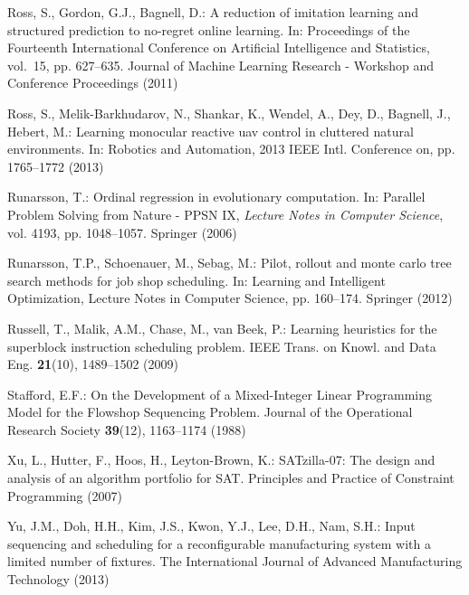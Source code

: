 \documentclass[twocolumn]{svjour3}
\begin{document}
\begin{thebibliography}{10}
    Ross, S., Gordon, G.J., Bagnell, D.: A reduction of imitation learning and
    structured prediction to no-regret online learning.
    \newblock In: Proceedings of the Fourteenth International Conference on
    Artificial Intelligence and Statistics, vol.~15, pp. 627--635. Journal of
    Machine Learning Research - Workshop and Conference Proceedings (2011)
    
    Ross, S., Melik-Barkhudarov, N., Shankar, K., Wendel, A., Dey, D., Bagnell, 
    J.,
    Hebert, M.: Learning monocular reactive uav control in cluttered natural
    environments.
    \newblock In: Robotics and Automation, 2013 IEEE Intl. Conference on, pp.
    1765--1772 (2013)
    
    Runarsson, T.: Ordinal regression in evolutionary computation.
    \newblock In: Parallel Problem Solving from Nature - PPSN IX, \emph{Lecture
        Notes in Computer Science}, vol. 4193, pp. 1048--1057. Springer (2006)
    
    Runarsson, T.P., Schoenauer, M., Sebag, M.: Pilot, rollout and monte carlo 
    tree
    search methods for job shop scheduling.
    \newblock In: Learning and Intelligent Optimization, Lecture Notes in 
    Computer
    Science, pp. 160--174. Springer (2012)
    
    Russell, T., Malik, A.M., Chase, M., van Beek, P.: Learning heuristics for 
    the
    superblock instruction scheduling problem.
    \newblock IEEE Trans. on Knowl. and Data Eng. \textbf{21}(10), 1489--1502
    (2009)
    
    Stafford, E.F.: {On the Development of a Mixed-Integer Linear Programming 
    Model
        for the Flowshop Sequencing Problem}.
    \newblock Journal of the Operational Research Society \textbf{39}(12),
    1163--1174 (1988)
    
    Xu, L., Hutter, F., Hoos, H., Leyton-Brown, K.: {SATzilla-07: The design and
        analysis of an algorithm portfolio for SAT}.
    \newblock Principles and Practice of Constraint Programming  (2007)
    
    Yu, J.M., Doh, H.H., Kim, J.S., Kwon, Y.J., Lee, D.H., Nam, S.H.: {Input
        sequencing and scheduling for a reconfigurable manufacturing system 
        with a
        limited number of fixtures}.
    \newblock The International Journal of Advanced Manufacturing Technology
    (2013)
    
\end{thebibliography}
\end{document}
